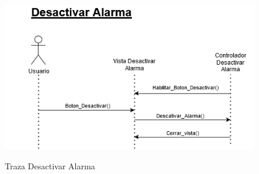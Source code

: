 \begin{figure}[H]
	\centering
	\caption{Traza Desactivar Alarma}
	\includegraphics[width=\textwidth]{./img/Desactivar_alarma.png}
        \vspace{10pt}
	\label{fig:Traza Desactivar Alarma}
\end{figure}

